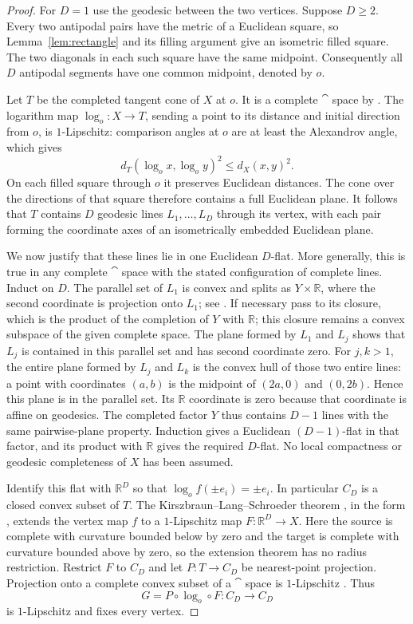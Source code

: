 \begin{proof}
For $D=1$ use the geodesic between the two vertices. Suppose $D\ge2$.
Every two antipodal pairs have the metric of a Euclidean square, so
Lemma~\ref{lem:rectangle} and its filling argument give an isometric
filled square. The two diagonals in each such square have the same
midpoint. Consequently all $D$ antipodal segments have one common
midpoint, denoted by $o$.

Let $T$ be the completed tangent cone of $X$ at $o$. It is a complete
$\cat$ space by \cite[II.3.19, p.~191]{BH1999}. The logarithm map
$\log_o:X\longrightarrow T$, sending a point to its distance and
initial direction from $o$, is $1$-Lipschitz: comparison angles at $o$
are at least the Alexandrov angle, which gives
\[
 d_T(\log_o x,\log_o y)^2
 \le d_X(x,y)^2.
\]
On each filled square through $o$ it preserves Euclidean distances.
The cone over the directions of that square therefore contains a full
Euclidean plane. It follows that $T$ contains $D$ geodesic lines
$L_1,\ldots,L_D$ through its vertex, with each pair forming the
coordinate axes of an isometrically embedded Euclidean plane.

We now justify that these lines lie in one Euclidean $D$-flat. More
generally, this is true in any complete $\cat$ space with the stated
configuration of complete lines. Induct on $D$. The parallel set of
$L_1$ is convex and splits as $Y\times\mathbb R$, where the second
coordinate is projection onto $L_1$;
see \cite[II.2.14, p.~183]{BH1999}. If necessary pass to its closure,
which is the product of the completion of $Y$ with $\mathbb R$; this
closure remains a convex subspace of the given complete space. The
plane formed by $L_1$ and $L_j$ shows that $L_j$ is contained in this
parallel set and has second coordinate zero. For $j,k>1$, the entire
plane formed by $L_j$ and $L_k$ is the convex hull of those two entire
lines: a point with coordinates $(a,b)$ is the midpoint of $(2a,0)$
and $(0,2b)$. Hence this plane is in the parallel set. Its
$\mathbb R$ coordinate is zero because that coordinate is affine on
geodesics. The completed factor $Y$ thus contains $D-1$ lines with
the same pairwise-plane property. Induction gives a Euclidean
$(D-1)$-flat in that factor, and its product with $\mathbb R$ gives
the required $D$-flat. No local compactness or geodesic completeness
of $X$ has been assumed.

Identify this flat with $\mathbb R^D$ so that
$\log_o f(\pm e_i)=\pm e_i$. In particular $C_D$ is a closed convex
subset of $T$. The Kirszbraun--Lang--Schroeder theorem
\cite{LangSchroeder1997}, in the form
\cite[Theorem~10.14, p.~160]{AKP2023}, extends the vertex map $f$ to a
$1$-Lipschitz map $F:\mathbb R^D\longrightarrow X$. Here the source
is complete with curvature bounded below by zero and the target is
complete with curvature bounded above by zero, so the extension
theorem has no radius restriction. Restrict $F$ to $C_D$ and let
$P:T\longrightarrow C_D$ be nearest-point projection. Projection
onto a complete convex subset of a $\cat$ space is $1$-Lipschitz
\cite[II.2.4]{BH1999}. Thus
\[
 G=P\circ\log_o\circ F:C_D\longrightarrow C_D
\]
is $1$-Lipschitz and fixes every vertex.


\end{proof}
